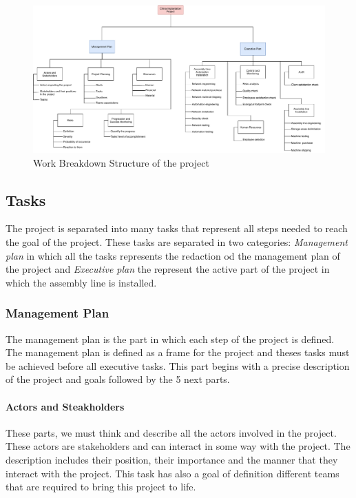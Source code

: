 \begin{figure}[h]

\centering
\includegraphics[scale=0.5]{Img/wbs-management-inter.pdf}
\caption{Work Breakdown Structure of the project}

\end{figure}

\subsection{Tasks}

The project is separated into many tasks that represent all steps needed to reach the goal of the project.
These tasks are separated in two categories: \emph{Management plan} in which all the tasks represents the redaction od the management plan of the project and \emph{Executive plan} the represent the active part of the project in which the assembly line is installed.

\subsubsection{Management Plan}

The management plan is the part in which each step of the project is defined.
The management plan is defined as a frame for the project and theses tasks must be achieved before all executive tasks.
This part begins with a precise description of the project and goals followed by the 5 next parts.

\paragraph{Actors and Steakholders} These parts, we must think and describe all the actors involved in the project.
These actors are stakeholders and can interact in some way with the project.
The description includes their position, their importance and the manner that they interact with the project.
This task has also a goal of definition different teams that are required to bring this project to life.

